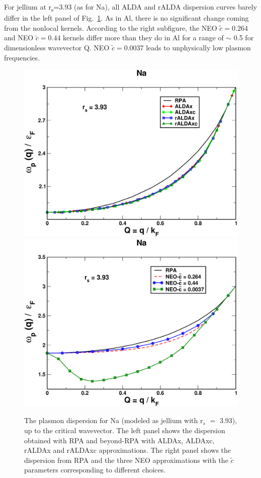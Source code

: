 \documentclass[aps,amsmath,amssymb, preprint, 12pt]{revtex4-1}
\begin{document}


For jellium at r\textsubscript{s}=3.93 (as for Na), all ALDA and rALDA dispersion curves barely differ in the left panel of Fig.~\ref{fig2}. As in Al, there is no significant change coming from the nonlocal kernels. According to the right subfigure, the NEO  \( \widetilde{c}=0.264 \)  and NEO  \( \widetilde{c}=0.44 \)  kernels differ more than they do in Al for a range of $ \sim $ 0.5 for dimensionless wavevector Q. NEO  \( \widetilde{c}=0.0037 \)  leads to unphysically low plasmon frequencies. \\




\begin{figure}[h!]	
	\includegraphics[scale=0.3]{figure_3.pdf}
	\includegraphics[scale=0.3]{figure_4.pdf}
	\caption{The plasmon dispersion for Na (modeled as jellium with r$_s$ $=$ 3.93), up to the critical wavevector. The left panel shows the dispersion obtained with RPA and beyond-RPA with ALDAx, ALDAxc, rALDAx and rALDAxc approximations. The right panel shows the dispersion from RPA and the three NEO approximations with the  \( \widetilde{c} \)  parameters corresponding to different choices.}
	\label{fig2}
\end{figure}
\end{document}
